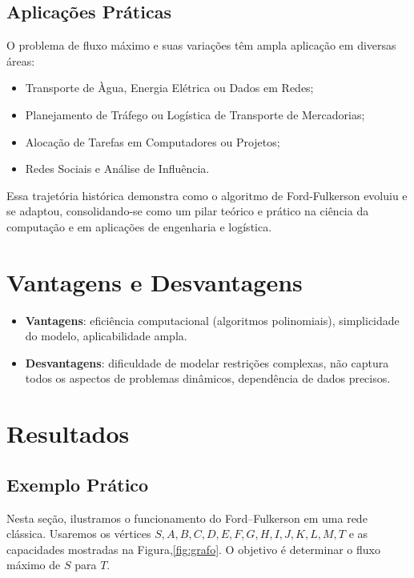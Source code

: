 \documentclass[12pt]{article}
\begin{document}
\subsection{Aplicações Práticas}

O problema de fluxo máximo e suas variações têm ampla aplicação em diversas áreas:


\begin{itemize}
    \item Transporte de Àgua, Energia Elétrica ou Dados em Redes;
    \item Planejamento de Tráfego ou Logística de Transporte de Mercadorias;
    \item Alocação de Tarefas em Computadores ou Projetos;
    \item Redes Sociais e Análise de Influência.
\end{itemize}


Essa trajetória histórica demonstra como o algoritmo de Ford-Fulkerson evoluiu e se adaptou, consolidando-se como um pilar teórico e prático na ciência da computação e em aplicações de engenharia e logística.


\section{Vantagens e Desvantagens} \label{sec:vantagens}

\begin{itemize}
    \item \textbf{Vantagens}: eficiência computacional (algoritmos polinomiais), simplicidade do modelo, aplicabilidade ampla.
    \item \textbf{Desvantagens}: dificuldade de modelar restrições complexas, não captura todos os aspectos de problemas dinâmicos, dependência de dados precisos.
\end{itemize}


\section{Resultados}
\subsection{Exemplo Prático} \label{sec:implementacao} 

Nesta seção, ilustramos o funcionamento do Ford–Fulkerson em uma rede clássica. Usaremos os vértices ${S, A, B, C, D, E, F, G, H, I, J, K, L , M, T}$ e as capacidades mostradas na Figura,\ref{fig:grafo}. O objetivo é determinar o fluxo máximo de $S$ para $T$.\vskip0.5cm
\end{document}
